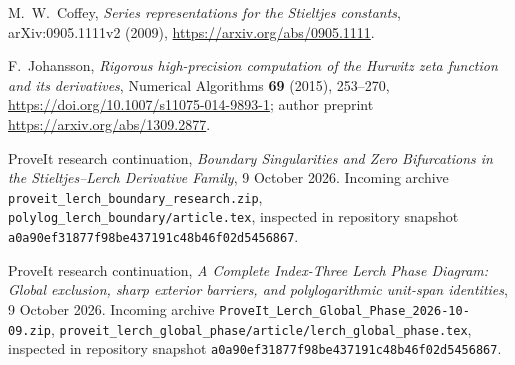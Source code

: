 M.~W.~Coffey,
\emph{Series representations for the Stieltjes constants},
arXiv:0905.1111v2 (2009),
\url{https://arxiv.org/abs/0905.1111}.

F.~Johansson,
\emph{Rigorous high-precision computation of the Hurwitz zeta function
and its derivatives},
Numerical Algorithms \textbf{69} (2015), 253--270,
\url{https://doi.org/10.1007/s11075-014-9893-1};
author preprint \url{https://arxiv.org/abs/1309.2877}.

ProveIt research continuation,
\emph{Boundary Singularities and Zero Bifurcations in the Stieltjes--Lerch
Derivative Family}, 9 October 2026.
Incoming archive \texttt{proveit\_lerch\_boundary\_research.zip},
\texttt{polylog\_lerch\_boundary/article.tex}, inspected in repository
snapshot \texttt{a0a90ef31877f98be437191c48b46f02d5456867}.

ProveIt research continuation,
\emph{A Complete Index-Three Lerch Phase Diagram: Global exclusion,
sharp exterior barriers, and polylogarithmic unit-span identities},
9 October 2026. Incoming archive
\texttt{ProveIt\_Lerch\_Global\_Phase\_2026-10-09.zip},
\texttt{proveit\_lerch\_global\_phase/article/lerch\_global\_phase.tex},
inspected in repository snapshot
\texttt{a0a90ef31877f98be437191c48b46f02d5456867}.
